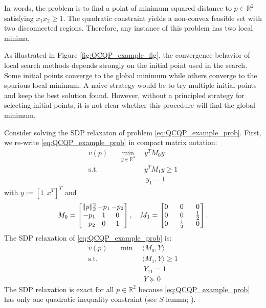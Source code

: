 \documentclass[10pt]{article} %
\theoremstyle{plain}
\theoremstyle{definition}
\theoremstyle{remark}
\begin{document}
In words, the problem is to find a point of minimum squared distance to $p \in \mathbb{R}^2$ satisfying $x_1 x_2 \geq 1$. The quadratic constraint yields a non-convex feasible set with two disconnected regions. Therefore, any instance of this problem has two local minima.

As illustrated in Figure \ref{fig:QCQP_example_fig}, the convergence behavior of local search methods depends strongly on the initial point used in the search. Some initial points converge to the global minimum while others converge to the spurious local minimum. A naive strategy would be to try multiple initial points and keep the best solution found. However, without a principled strategy for selecting initial points, it is not clear whether this procedure will find the global minimum.

Consider solving the SDP relaxaton of problem \eqref{eq:QCQP_example_prob}. First, we re-write \eqref{eq:QCQP_example_prob} in compact matrix notation:
\setlength{\jot}{1pt}
\begin{equation}
\begin{aligned}
    v(p) = ~ \min_{y \in \mathbb{R}^3}~& y^T M_0 y \\
    \text{s.t.}~& y^T M_1 y \geq 1 \\
    &~y_1 = 1
\end{aligned}
\label{eq:QCQP_example_matrix}
\end{equation}
with $y := [1 ~~x^T]^T$ and
\begin{align*}
    \setlength{\arraycolsep}{1pt}
    M_0 = \begin{bmatrix}
        \|p\|_2^2 & -p_1 & -p_2 \\
        -p_1 & 1 & 0 \\
        -p_2 & 0 & 1
    \end{bmatrix}, \quad 
    \setlength{\arraycolsep}{8pt}
    M_1 = \begin{bmatrix}
        0 & 0 & 0 \\
        0 & 0 & \frac{1}{2} \\
        0 & \frac{1}{2} & 0
    \end{bmatrix}.
\end{align*}
The SDP relaxation of \eqref{eq:QCQP_example_prob} is:
\begin{equation}
\begin{aligned}
    \tilde{v}(p) = ~\min~&\langle M_0, Y \rangle \\
    \text{s.t.}~& \langle M_1, Y \rangle \geq 1 \nonumber \\
    & ~Y_{11} = 1 \\
    & ~Y \succeq 0
\end{aligned}
\label{eq:QCQP_example_SDP}
\end{equation}
The SDP relaxation is exact for all $p \in \mathbb{R}^2$ because \eqref{eq:QCQP_example_prob} has only one quadratic inequality constraint (see $S$-lemma; \citet{boyd2004convex}). 
\end{document}
